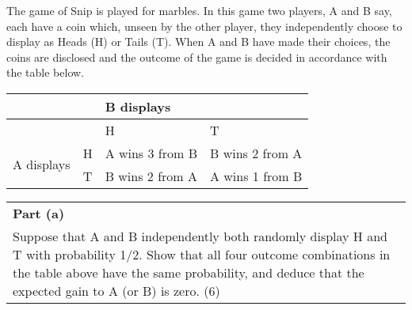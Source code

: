\documentclass[a4paper,12pt]{article}
\begin{document}
The game of Snip is played for marbles.  In this game two players, A and B say, each have a coin which, unseen by the other player, they independently choose to display as Heads (H) or Tails (T).  When A and B have made their choices, the coins are disclosed and the outcome of the game is decided in accordance with the table below.

\begin{center}
\begin{tabular}{|ll|l|l|}\hline
\multicolumn{2}{|l}{}   & \multicolumn{2}{l|}{B displays} \\ \hline
\multicolumn{2}{|l|}{}   & H      & T      \\ 
\multirow{2}{*}{A displays} & H & A wins 3 from B & B wins 2 from A \\ 
       & T & B wins 2 from A & A wins 1 from B \\ \hline
\end{tabular}
\end{center}


  \begin{table}[ht!]
  \centering
  \begin{tabular}{|p{15cm}|}
  \hline  
  \noindent \textbf{Part (a)} \\Suppose that A and B independently both randomly display H and T with probability 1/2.  Show that all four outcome combinations in the table above have the same probability, and deduce that the expected gain to A (or B) is zero. (6) 
\\ \hline
   \end{tabular}
 \end{table}
\end{document}
